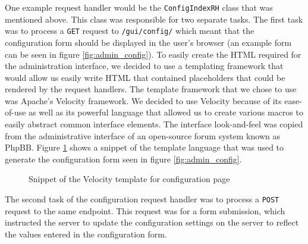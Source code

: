 One example request handler would be the \texttt{ConfigIndexRH} class that was mentioned above. This class was responsible for two separate tasks. The first task was to process a \texttt{GET} request to \texttt{/gui/config/} which meant that the configuration form should be displayed in the user's browser (an example form can be seen in figure \ref{fig:admin_config}). To easily create the HTML required for the administration interface, we decided to use a templating framework that would allow us easily write HTML that contained placeholders that could be rendered by the request handlers. The template framework that we chose to use was Apache's Velocity\cite{velocity} framework. We decided to use Velocity because of its ease-of-use as well as its powerful language that allowed us to create various macros to easily abstract common interface elements. The interface look-and-feel was copied from the administrative interface of an open-source forum system known as PhpBB\cite{phpbb}. Figure \ref{code:tpl_config} shows a snippet of the template language that was used to generate the configuration form seen in figure \ref{fig:admin_config}.

\begin{figure}[htb]
  \centering
  \small
  
  \normalsize
  \caption{Snippet of the Velocity template for configuration page}
  \label{code:tpl_config}
\end{figure}

The second task of the configuration request handler was to process a \texttt{POST} request to the same endpoint. This request was for a form submission, which instructed the server to update the configuration settings on the server to reflect the values entered in the configuration form.